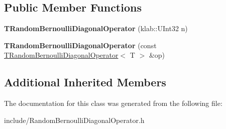 \subsection*{Public Member Functions}
\begin{DoxyCompactItemize}
\item 
{\bfseries T\+Random\+Bernoulli\+Diagonal\+Operator} (klab\+::\+U\+Int32 n)\hypertarget{classkl1p_1_1TRandomBernoulliDiagonalOperator_a51f1bbbed72c171b4fcac3d5b0237e64}{}\label{classkl1p_1_1TRandomBernoulliDiagonalOperator_a51f1bbbed72c171b4fcac3d5b0237e64}

\item 
{\bfseries T\+Random\+Bernoulli\+Diagonal\+Operator} (const \hyperlink{classkl1p_1_1TRandomBernoulliDiagonalOperator}{T\+Random\+Bernoulli\+Diagonal\+Operator}$<$ T $>$ \&op)\hypertarget{classkl1p_1_1TRandomBernoulliDiagonalOperator_afa12ef87bc0c43974fc63751e14042c8}{}\label{classkl1p_1_1TRandomBernoulliDiagonalOperator_afa12ef87bc0c43974fc63751e14042c8}

\end{DoxyCompactItemize}
\subsection*{Additional Inherited Members}


The documentation for this class was generated from the following file\+:\begin{DoxyCompactItemize}
\item 
include/Random\+Bernoulli\+Diagonal\+Operator.\+h\end{DoxyCompactItemize}
